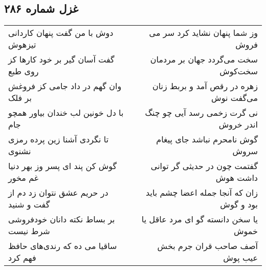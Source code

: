 \begin{center}
\section*{غزل شماره ۲۸۶}
\label{sec:sh286}
\begin{longtable}{l p{0.5cm} r}
دوش با من گفت پنهان کاردانی تیزهوش
&&
وز شما پنهان نشاید کرد سر می فروش
\\
گفت آسان گیر بر خود کارها کز روی طبع
&&
سخت می‌گردد جهان بر مردمان سخت‌کوش
\\
وان گهم در داد جامی کز فروغش بر فلک
&&
زهره در رقص آمد و بربط زنان می‌گفت نوش
\\
با دل خونین لب خندان بیاور همچو جام
&&
نی گرت زخمی رسد آیی چو چنگ اندر خروش
\\
تا نگردی آشنا زین پرده رمزی نشنوی
&&
گوش نامحرم نباشد جای پیغام سروش
\\
گوش کن پند ای پسر وز بهر دنیا غم مخور
&&
گفتمت چون در حدیثی گر توانی داشت هوش
\\
در حریم عشق نتوان زد دم از گفت و شنید
&&
زان که آنجا جمله اعضا چشم باید بود و گوش
\\
بر بساط نکته دانان خودفروشی شرط نیست
&&
یا سخن دانسته گو ای مرد عاقل یا خموش
\\
ساقیا می ده که رندی‌های حافظ فهم کرد
&&
آصف صاحب قران جرم بخش عیب پوش
\\
\end{longtable}
\end{center}
